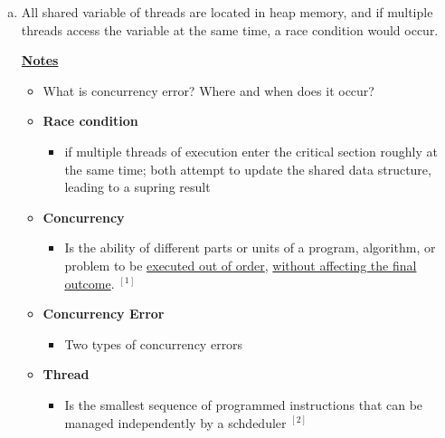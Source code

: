 \documentclass[12pt]{article}
\begin{document}
\begin{enumerate}[1.]
\begin{enumerate}[a)]
        \item

        All shared variable of threads are located in heap memory, and if multiple threads
        access the variable at the same time, a race condition would occur.

        \bigskip

        \underline{\textbf{Notes}}

        \begin{itemize}
            \item What is concurrency error? Where and when does it occur?
            \item \textbf{Race condition}

            \begin{itemize}
                \item if multiple threads of execution enter the critical section
                roughly at the same time; both attempt to update the shared data structure,
                leading to a supring result
            \end{itemize}

            \item \textbf{Concurrency}

            \begin{itemize}
                \item Is the ability of different parts or units of a program, algorithm,
                or problem to be \underline{executed out of order}, \underline{without affecting the final
                outcome}. $^{[1]}$
            \end{itemize}

            \item \textbf{Concurrency Error}

            \begin{itemize}
                \item Two types of concurrency errors
            \end{itemize}

            \item \textbf{Thread}

            \begin{itemize}
                \item Is the smallest sequence of programmed instructions that can be managed independently
                by a schdeduler $^{[2]}$


\end{itemize}
\end{itemize}
\end{enumerate}
\end{enumerate}
\end{document}
